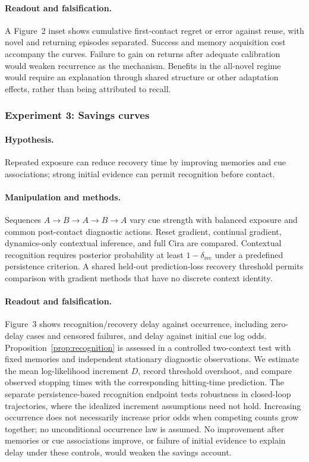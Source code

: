 \paragraph{Readout and falsification.}
A Figure~2 inset shows cumulative first-contact regret or error against reuse, with novel and returning episodes separated. Success and memory acquisition cost accompany the curves. Failure to gain on returns after adequate calibration would weaken recurrence as the mechanism. Benefits in the all-novel regime would require an explanation through shared structure or other adaptation effects, rather than being attributed to recall.

\subsubsection{Experiment 3: Savings curves}
\paragraph{Hypothesis.}
Repeated exposure can reduce recovery time by improving memories and cue associations; strong initial evidence can permit recognition before contact.

\paragraph{Manipulation and methods.}
Sequences $A\rightarrow B\rightarrow A\rightarrow B\rightarrow A$ vary cue strength with balanced exposure and common post-contact diagnostic actions. Reset gradient, continual gradient, dynamics-only contextual inference, and full Cira are compared. Contextual recognition requires posterior probability at least $1-\delta_{\mathrm{rec}}$ under a predefined persistence criterion. A shared held-out prediction-loss recovery threshold permits comparison with gradient methods that have no discrete context identity.

\paragraph{Readout and falsification.}
Figure~3 shows recognition/recovery delay against occurrence, including zero-delay cases and censored failures, and delay against initial cue log odds. Proposition~\ref{prop:recognition} is assessed in a controlled two-context test with fixed memories and independent stationary diagnostic observations. We estimate the mean log-likelihood increment $D$, record threshold overshoot, and compare observed stopping times with the corresponding hitting-time prediction. The separate persistence-based recognition endpoint tests robustness in closed-loop trajectories, where the idealized increment assumptions need not hold. Increasing occurrence does not necessarily increase prior odds when competing counts grow together; no unconditional occurrence law is assumed. No improvement after memories or cue associations improve, or failure of initial evidence to explain delay under these controls, would weaken the savings account.

